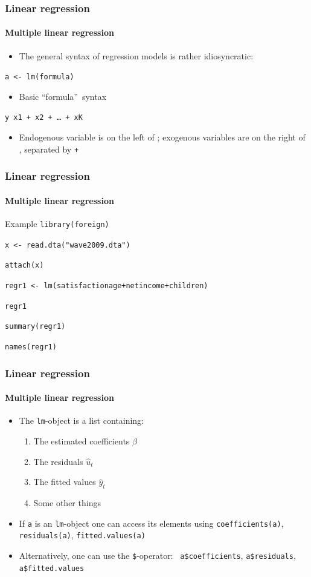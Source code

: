 \documentclass[title={Introduction to R}, author={Mutschler and Zaharieva}, inst={Institute for Econometrics and Empirical Economics}]{beamer}
\begin{document}
\begin{frame}
\frametitle{Linear regression}
\framesubtitle{Multiple linear regression}
\begin{itemize}
\item The general syntax of regression models is rather idiosyncratic:
\end{itemize}
\begin{center}
\texttt{a <- lm(formula)}
\end{center}
\begin{itemize}
\item Basic \textquotedblleft formula\textquotedblright\ syntax
\end{itemize}
\begin{center}
\texttt{y  x1 + x2 + \ldots\ + xK}
\end{center}
\begin{itemize}
\item Endogenous variable is on the left of \texttt{}; exogenous
variables are on the right of \texttt{}, separated by \texttt{+}
\end{itemize}
\end{frame}


\begin{frame}
\frametitle{Linear regression}
\framesubtitle{Multiple linear regression}
\begin{block}{Example}
\texttt{library(foreign)}

\texttt{x <- read.dta("wave2009.dta")}

\texttt{attach(x)}

\texttt{regr1 <- lm(satisfactionage+netincome+children)}

\texttt{regr1}

\texttt{summary(regr1)}

\texttt{names(regr1)}
\end{block}
\end{frame}


\begin{frame}
\frametitle{Linear regression}
\framesubtitle{Multiple linear regression}
\begin{itemize}
\item The \texttt{lm}-object is a list containing:
\begin{enumerate}
\item The estimated coefficients $\hat{\beta}$
\item The residuals $\hat{u}_{t}$
\item The fitted values $\hat{y}_{t}$
\item Some other things
\end{enumerate}
\item If \texttt{a} is an \texttt{lm}-object one can access its elements
using\newline
\texttt{coefficients(a)}, \texttt{residuals(a)}, \texttt{fitted.values(a)}
\item Alternatively, one can use the \texttt{\$}-operator: \texttt{%
a\$coefficients}, \texttt{a\$residuals}, \texttt{a\$fitted.values}
\end{itemize}
\end{frame}
\end{document}
